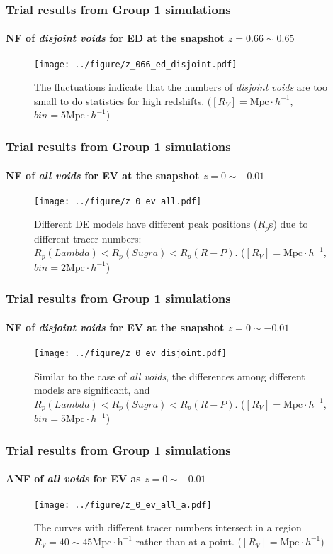 \documentclass{beamer}
\newtheorem{Narrow down the analysis}{Narrow down the analysis}
\begin{document}
\begin{frame}
	\frametitle{Trial results from Group 1 simulations}
	\framesubtitle{NF of \textit{disjoint voids} for ED at the snapshot $z=0.66\sim 0.65$}
	\pause 
\begin{figure}
\centering
\texttt{[image: ../figure/z\_066\_ed\_disjoint.pdf]}
\caption{The fluctuations indicate that the numbers of \textit{disjoint voids} are too small to do statistics for high redshifts. ($[R_{V}]=\mathrm{Mpc}\cdot h^{-1}$, $bin=5\mathrm{Mpc}\cdot h^{-1}$)}
\label{8}
\end{figure}
\end{frame}

\begin{frame}
	\frametitle{Trial results from Group 1 simulations}
	\framesubtitle{NF of \textit{all voids} for EV at the snapshot $z=0\sim -0.01$}
	\pause 
\begin{figure}
\centering
\texttt{[image: ../figure/z\_0\_ev\_all.pdf]}
\caption{Different DE models have different peak positions ($R_{p}$s) due to different tracer numbers: $R_{p}(Lambda)<R_{p}(Sugra)<R_{p}(R-P)$. ($[R_{V}]=\mathrm{Mpc}\cdot h^{-1}$, $bin=2\mathrm{Mpc}\cdot h^{-1}$)}
\label{3}
\end{figure}
\end{frame}

\begin{frame}
	\frametitle{Trial results from Group 1 simulations}
	\framesubtitle{NF of \textit{disjoint voids} for EV at the snapshot $z=0\sim -0.01$}
	\pause 
\begin{figure}
\centering
\texttt{[image: ../figure/z\_0\_ev\_disjoint.pdf]}
\caption{Similar to the case of \textit{all voids}, the differences among different models are significant, and $R_{p}(Lambda)<R_{p}(Sugra)<R_{p}(R-P)$. ($[R_{V}]=\mathrm{Mpc}\cdot h^{-1}$, $bin=5\mathrm{Mpc}\cdot h^{-1}$)}
\label{4}
\end{figure}
\end{frame}

\begin{frame}
	\frametitle{Trial results from Group 1 simulations}
	\framesubtitle{ANF of \textit{all voids} for EV as $z=0\sim -0.01$}
	\pause 
\begin{figure}
\centering
\texttt{[image: ../figure/z\_0\_ev\_all\_a.pdf]}
\caption{The curves with different tracer numbers intersect in a region $R_{V}=40\sim 45\mathrm{Mpc\cdot h^{-1}}$ rather than at a point. ($[R_{V}]=\mathrm{Mpc}\cdot h^{-1}$)}
\label{5}
\end{figure}
\end{frame}
\end{document}
